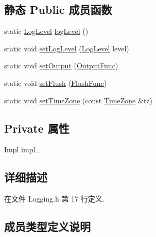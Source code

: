 \subsection*{静态 Public 成员函数}
\begin{DoxyCompactItemize}
\item 
static \hyperlink{classmuduo_1_1Logger_aca1fd1d8935433e6ba2e3918214e07f9}{Log\+Level} \hyperlink{classmuduo_1_1Logger_a0cf9854e69e225406d284d66ebaf9dfe}{log\+Level} ()
\item 
static void \hyperlink{classmuduo_1_1Logger_afdf5e54919991319a042cc6ad56c68ff}{set\+Log\+Level} (\hyperlink{classmuduo_1_1Logger_aca1fd1d8935433e6ba2e3918214e07f9}{Log\+Level} level)
\item 
static void \hyperlink{classmuduo_1_1Logger_a665e9bd6827c71419e511203aa38b722}{set\+Output} (\hyperlink{classmuduo_1_1Logger_a34167efc62501fda5dcd3e2c81a3497b}{Output\+Func})
\item 
static void \hyperlink{classmuduo_1_1Logger_af1e4b6b611cd983fa68ec4038d45b621}{set\+Flush} (\hyperlink{classmuduo_1_1Logger_a355919f024ed4b42a85a6ddd28aede29}{Flush\+Func})
\item 
static void \hyperlink{classmuduo_1_1Logger_a621b7814fdc22f8982ddc5325ba646f6}{set\+Time\+Zone} (const \hyperlink{classmuduo_1_1TimeZone}{Time\+Zone} \&tz)
\end{DoxyCompactItemize}
\subsection*{Private 属性}
\begin{DoxyCompactItemize}
\item 
\hyperlink{classmuduo_1_1Logger_1_1Impl}{Impl} \hyperlink{classmuduo_1_1Logger_a21911ce5df42a8fac765ff5c446bee64}{impl\+\_\+}
\end{DoxyCompactItemize}


\subsection{详细描述}


在文件 Logging.\+h 第 17 行定义.



\subsection{成员类型定义说明}
\mbox{\label{classmuduo_1_1Logger_a355919f024ed4b42a85a6ddd28aede29}} 
